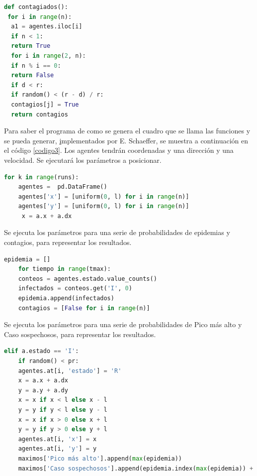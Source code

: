 \documentclass{article}
\begin{document}
\begin{lstlisting}[caption= Instrucciones para generar parámetros epidemiológicos infectados, label=codigo3, language=Python]
def contagiados():
 for i in range(n):
  a1 = agentes.iloc[i]
  if n < 1:
  return True
  for i in range(2, n):
  if n % i == 0:
  return False
  if d < r:
  if random() < (r - d) / r:
  contagios[j] = True
  return contagios
\end{lstlisting}


Para saber el programa de como se genera el cuadro que se llama las funciones y se pueda generar, \href{https://https://satuelisa.github.io/simulation/p6.html} implementados por E. Schaeffer, se muestra a continuación en el código \ref{codigo3}. Los agentes tendrán coordenadas  y una dirección y una velocidad. Se ejecutará los parámetros a posicionar. \cite{elisa1}

\begin{lstlisting}[caption= Instrucción para generar agentes, label=codigo4, language=Python]
for k in range(runs):
    agentes =  pd.DataFrame()
    agentes['x'] = [uniform(0, l) for i in range(n)]
    agentes['y'] = [uniform(0, l) for i in range(n)]
     x = a.x + a.dx
\end{lstlisting}

Se ejecuta los parámetros para una serie de probabilidades de epidemias y contagios, para representar los resultados. 

\begin{lstlisting}[caption= Resultados de epidemias y contagios, label=codigo4, language=Python]
epidemia = []
    for tiempo in range(tmax):
    conteos = agentes.estado.value_counts()
    infectados = conteos.get('I', 0)
    epidemia.append(infectados)
    contagios = [False for i in range(n)]
\end{lstlisting}

Se ejecuta los parámetros para una serie de probabilidades de Pico más alto y Caso sospechosos, para representar los resultados.

\begin{lstlisting}[caption= Resultados de Pico más alto y Caso sospechosos, label=codigo4, language=Python]
elif a.estado == 'I':
    if random() < pr:
    agentes.at[i, 'estado'] = 'R'
    x = a.x + a.dx
    y = a.y + a.dy
    x = x if x < l else x - l
    y = y if y < l else y - l
    x = x if x > 0 else x + l
    y = y if y > 0 else y + l
    agentes.at[i, 'x'] = x
    agentes.at[i, 'y'] = y
    maximos['Pico más alto'].append(max(epidemia))
    maximos['Caso sospechosos'].append(epidemia.index(max(epidemia)) + 1)

\end{lstlisting}
\end{document}
